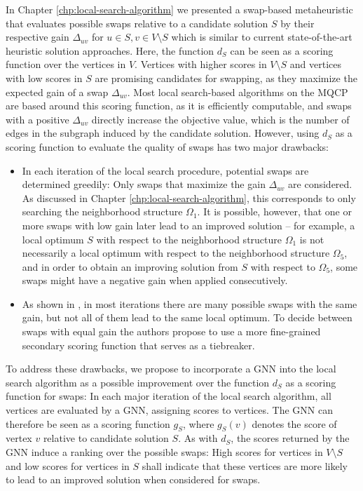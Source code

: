 \documentclass[draft,final]{vutinfth} %
\begin{document}
In Chapter \ref{chp:local-search-algorithm} we presented a swap-based metaheuristic that evaluates possible swaps relative to a candidate solution $S$ by their respective gain $\Delta_{uv}$ for $u \in S, v \in V \setminus S$ which is similar to current state-of-the-art heuristic solution approaches. 
Here, the function $d_S$ can be seen as a scoring function over the vertices in $V$. Vertices with higher scores in $V \setminus S$ and vertices with low scores in $S$ are promising candidates for swapping, as they maximize the expected gain of a swap $\Delta_{uv}$. 
Most local search-based algorithms on the MQCP are based around this scoring function, as it is efficiently computable, and swaps with a positive $\Delta_{uv}$ directly increase the objective value, which is the number of edges in the subgraph induced by the candidate solution. 
However, using $d_S$ as a scoring function to evaluate the quality of swaps has two major drawbacks:
\begin{itemize}
    \item In each iteration of the local search procedure, potential swaps are determined greedily: Only swaps that maximize the gain $\Delta_{uv}$ are considered. As discussed in Chapter \ref{chp:local-search-algorithm}, this corresponds to only searching the neighborhood structure $\Omega_1$. It is possible, however, that one or more swaps with low gain later lead to an improved solution -- for example, a local optimum $S$ with respect to the neighborhood structure $\Omega_1$ is not necessarily a local optimum with respect to the neighborhood structure $\Omega_5$, and in order to obtain an improving solution from $S$ with respect to $\Omega_5$, some swaps might have a negative gain when applied consecutively. 
    \item As shown in \cite{chen_nuqclq_2021}, in most iterations there are many possible swaps with the same gain, but not all of them lead to the same local optimum. To decide between swaps with equal gain the authors propose to use a more fine-grained secondary scoring function that serves as a tiebreaker. 
\end{itemize}

To address these drawbacks, we propose to incorporate a GNN into the local search algorithm as a possible improvement over the function $d_S$ as a scoring function for swaps: In each major iteration of the local search algorithm, all vertices are evaluated by a GNN, assigning scores to vertices. The GNN can therefore be seen as a scoring function $g_S$, where $g_S(v)$ denotes the score of vertex $v$ relative to candidate solution $S$. 
As with $d_S$, the scores returned by the GNN induce a ranking over the possible swaps: High scores for vertices in $V \setminus S$ and low scores for vertices in $S$ shall indicate that these vertices are more likely to lead to an improved solution when considered for swaps. 
\end{document}
